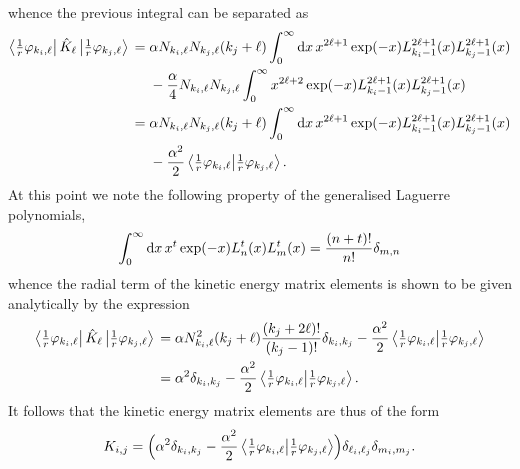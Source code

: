 \documentclass[]{article}
\begin{document}
whence the previous integral can be separated as
\begin{alignat*}{2}
  \bra{\tfrac{1}{r}\varphi_{k_{i}, \ell}}
  \hat{K}_{\ell}
  \ket{\tfrac{1}{r}\varphi_{k_{j}, \ell}}
  {}={}
  &
  \alpha
  N_{k_{i}, \ell}
  N_{k_{j}, \ell}
  \lr{k_{j} + \ell}
  \int_{0}^{\infty}
  \dd{x}
  x^{2\ell + 1}
  \exponential\lr{-x}
  L_{k_{i} - 1}^{2 \ell + 1}\lr{x}
  L_{k_{j} - 1}^{2 \ell + 1}\lr{x}
  \\
  &
  {}-{}
  \dfrac{\alpha}{4}
  N_{k_{i}, \ell}
  N_{k_{j}, \ell}
  \int_{0}^{\infty}
  x^{2\ell + 2}
  \exponential\lr{-x}
  L_{k_{i} - 1}^{2 \ell + 1}\lr{x}
  L_{k_{j} - 1}^{2 \ell + 1}\lr{x}
  \\
  {}={}
  &
  \alpha
  N_{k_{i}, \ell}
  N_{k_{j}, \ell}
  \lr{k_{j} + \ell}
  \int_{0}^{\infty}
  \dd{x}
  x^{2\ell + 1}
  \exponential\lr{-x}
  L_{k_{i} - 1}^{2 \ell + 1}\lr{x}
  L_{k_{j} - 1}^{2 \ell + 1}\lr{x}
  \\
  &
  {}-{}
  \dfrac{\alpha^{2}}{2}
  \bra{\tfrac{1}{r}\varphi_{k_{i}, \ell}}
  \ket{\tfrac{1}{r}\varphi_{k_{j}, \ell}}
  .
\end{alignat*}
At this point we note the following property of the generalised Laguerre
polynomials,
\begin{equation*}
  \int_{0}^{\infty}
  \dd{x}
  x^{t}
  \exponential\lr{-x}
  L_{n}^{t}\lr{x}
  L_{m}^{t}\lr{x}
  =
  \dfrac
  {
    \lr{n + t}!
  }
  {
    n!
  }
  \delta_{m, n}
\end{equation*}
whence the radial term of the kinetic energy matrix elements is shown to be
given analytically by the expression
\begin{alignat*}{2}
  \bra{\tfrac{1}{r}\varphi_{k_{i}, \ell}}
  \hat{K}_{\ell}
  \ket{\tfrac{1}{r}\varphi_{k_{j}, \ell}}
  {}={}
  &
  \alpha
  N_{k_{i}, \ell}^{2}
  \lr{k_{j} + \ell}
  \dfrac
  {
    \lr{k_{j} + 2\ell}!
  }
  {
    \lr{k_{j} - 1}!
  }
  \delta_{k_{i}, k_{j}}
  -
  \dfrac{\alpha^{2}}{2}
  \bra{\tfrac{1}{r}\varphi_{k_{i}, \ell}}
  \ket{\tfrac{1}{r}\varphi_{k_{j}, \ell}}
  \\
  {}={}
  &
  \alpha^{2}
  \delta_{k_{i}, k_{j}}
  -
  \dfrac{\alpha^{2}}{2}
  \bra{\tfrac{1}{r}\varphi_{k_{i}, \ell}}
  \ket{\tfrac{1}{r}\varphi_{k_{j}, \ell}}
  .
\end{alignat*}
It follows that the kinetic energy matrix elements are thus of the form
\begin{equation*}
  K_{i, j}
  =
  \lr[\Big]
  {
    \alpha^{2}
    \delta_{k_{i}, k_{j}}
    -
    \dfrac{\alpha^{2}}{2}
    \bra{\tfrac{1}{r}\varphi_{k_{i}, \ell}}
    \ket{\tfrac{1}{r}\varphi_{k_{j}, \ell}}
  }
  \delta_{\ell_{i}, \ell_{j}}
  \delta_{m_{i}, m_{j}}
  .
\end{equation*}
\end{document}
